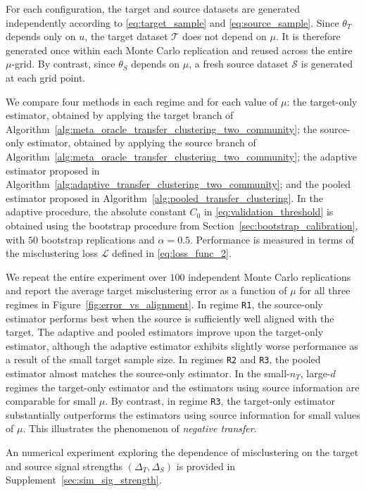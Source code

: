 \documentclass[10pt]{article}
\newcommand{\calT}{\mathcal T}
\newcommand{\trg}{T}
\newcommand{\thetaT}{\theta_{\trg}}
\newcommand{\nT}{n_{\trg}}
\newcommand{\DeltaT}{\Delta_{\trg}}
\newcommand{\calS}{\mathcal S}
\newcommand{\src}{S}
\newcommand{\thetaS}{\theta_{\src}}
\newcommand{\DeltaS}{\Delta_{\src}}
\begin{document}
For each configuration, the target and source datasets are generated independently according to \eqref{eq:target_sample} and \eqref{eq:source_sample}. Since $\thetaT$ depends only on $u$, the target dataset $\calT$ does not depend on $\mu$. It is therefore generated once within each Monte Carlo replication and reused across the entire $\mu$-grid. By contrast, since $\thetaS$ depends on $\mu$, a fresh source dataset $\calS$ is generated at each grid point.

We compare four methods in each regime and for each value of $\mu$: the target-only estimator, obtained by applying the target branch of Algorithm~\ref{alg:meta_oracle_transfer_clustering_two_community}; the source-only estimator, obtained by applying the source branch of Algorithm~\ref{alg:meta_oracle_transfer_clustering_two_community}; the adaptive estimator proposed in Algorithm~\ref{alg:adaptive_transfer_clustering_two_community}; and the pooled estimator proposed in Algorithm~\ref{alg:pooled_transfer_clustering}. In the adaptive procedure, the absolute constant $C_0$ in \eqref{eq:validation_threshold} is obtained using the bootstrap procedure from Section~\ref{sec:bootstrap_calibration}, with $50$ bootstrap replications and $\alpha=0.5$. Performance is measured in terms of the misclustering loss $\mathcal L$ defined in \eqref{eq:loss_func_2}.

We repeat the entire experiment over $100$ independent Monte Carlo replications and report the average target misclustering error as a function of $\mu$ for all three regimes in Figure~\ref{fig:error_vs_alignment}. In regime \texttt{R1}, the source-only estimator performs best when the source is sufficiently well aligned with the target. The adaptive and pooled estimators improve upon the target-only estimator, although the adaptive estimator exhibits slightly worse performance as a result of the small target sample size. 
In regimes \texttt{R2} and \texttt{R3}, the pooled estimator almost matches the source-only estimator.
In the small-$\nT$, large-$d$ regimes the target-only estimator and the estimators using source information are comparable for small $\mu$.
By contrast, in regime \texttt{R3}, 
the target-only estimator substantially outperforms the estimators using source information for small values of $\mu$. This illustrates the phenomenon of \emph{negative transfer}. 

An numerical experiment exploring the dependence of misclustering on the target and source signal strengths $(\DeltaT,\DeltaS)$ is provided in Supplement~\ref{sec:sim_sig_strength}.
\end{document}
